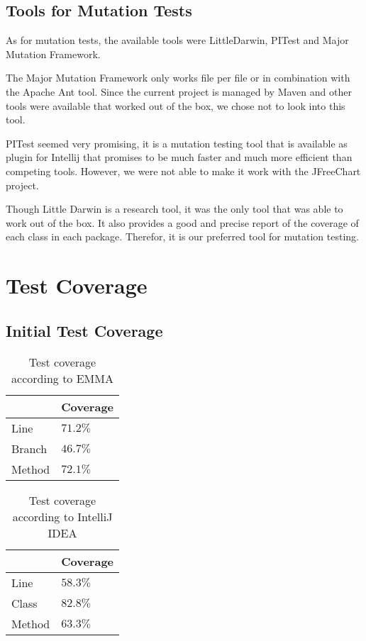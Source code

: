 \documentclass[]{article}
\begin{document}
\subsection{Tools for Mutation Tests}

As for mutation tests, the available tools were LittleDarwin, PITest and Major Mutation Framework. 

The Major Mutation Framework only works file per file or in combination with the Apache Ant tool. Since the current project is managed by Maven and other tools were available that worked out of the box, we chose not to look into this tool. 

PITest seemed very promising, it is a mutation testing tool that is available as plugin for Intellij that promises to be much faster and much more efficient than competing tools. However, we were not able to make it work with the JFreeChart project. 

Though Little Darwin is a research tool, it was the only tool that was able to work out of the box. It also provides a good and precise report of the coverage of each class in each package. Therefor, it is our preferred tool for mutation testing.  

\section{Test Coverage}

\subsection{Initial Test Coverage}

\begin{table}[]
	\begin{center}
	\begin{tabular}{|l||l|}
		\hline
		&  Coverage \\ \hline\hline
		Line	& $71.2\%$   \\
		Branch	& $46.7\%$  \\
		Method	& $72.1\%$  \\ \hline
	\end{tabular}
	\caption{Test coverage according to EMMA}
	\end{center}
	
\end{table}

\begin{table}[]
	\begin{center}
		\begin{tabular}{|l||l|}
			\hline
			&  Coverage \\ \hline\hline
			Line	& $58.3\%$   \\
			Class	& $82.8\%$  \\
			Method	& $63.3\%$  \\ \hline
		\end{tabular}
		\caption{Test coverage according to IntelliJ IDEA}
	\end{center}
\end{table}
\end{document}
